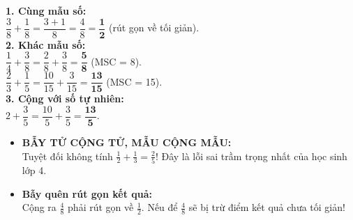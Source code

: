 \documentclass[14pt,a4paper,oneside]{extbook}
\begin{document}
\vspace{-2.5mm}
\noindent
\begin{minipage}[t]{0.49\textwidth}\vspace{0pt}
\begin{tcolorbox}[
  enhanced,
  colback=green!4!white,
  colframe=green!60!black,
  arc=2mm, boxrule=0.8pt,
  left=2mm, right=2mm, top=1.8mm, bottom=1.8mm,
  title={\footnotesize\bfseries\color{white}\faCheckCircle\ Ví dụ thực hành chuẩn mực}
]
{\footnotesize
\textbf{1. Cùng mẫu số:}\\
$\dfrac{3}{8} + \dfrac{1}{8} = \dfrac{3 + 1}{8} = \dfrac{4}{8} = \mathbf{\dfrac{1}{2}}$ (rút gọn về tối giản).\\
\textbf{2. Khác mẫu số:}\\
$\dfrac{1}{4} + \dfrac{3}{8} = \dfrac{2}{8} + \dfrac{3}{8} = \mathbf{\dfrac{5}{8}}$ (MSC = 8).\\
$\dfrac{2}{3} + \dfrac{1}{5} = \dfrac{10}{15} + \dfrac{3}{15} = \mathbf{\dfrac{13}{15}}$ (MSC = 15).\\
\textbf{3. Cộng với số tự nhiên:}\\
$2 + \dfrac{3}{5} = \dfrac{10}{5} + \dfrac{3}{5} = \mathbf{\dfrac{13}{5}}$.
}
\end{tcolorbox}
\end{minipage}
\hfill
\begin{minipage}[t]{0.49\textwidth}\vspace{0pt}
\begin{tcolorbox}[
  enhanced,
  colback=red!4!white,
  colframe=red!70!black,
  arc=2mm, boxrule=0.8pt,
  left=2mm, right=2mm, top=1.8mm, bottom=1.8mm,
  title={\footnotesize\bfseries\color{white}\faExclamationTriangle\ Mẹo tránh bẫy trắc nghiệm}
]
{\footnotesize
\begin{itemize}\setlength{\itemsep}{1.5pt}\setlength{\leftskip}{-2.5mm}
  \item \textbf{BẪY TỬ CỘNG TỬ, MẪU CỘNG MẪU:}\\
  Tuyệt đối không tính $\frac{1}{2} + \frac{1}{3} = \frac{2}{5}$! Đây là lỗi sai trầm trọng nhất của học sinh lớp 4.
  \item \textbf{Bẫy quên rút gọn kết quả:}\\
  Cộng ra $\frac{4}{8}$ phải rút gọn về $\frac{1}{2}$. Nếu để $\frac{4}{8}$ sẽ bị trừ điểm kết quả chưa tối giản!
\end{itemize}
}
\end{tcolorbox}
\end{minipage}
\end{document}
